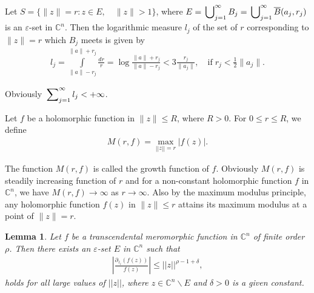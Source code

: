 \documentclass[11pt, reqno]{amsart}
\newtheorem*{cor A}{Corollary A}
\newtheorem*{cor B}{Corollary B}
\newtheorem{lem}{Lemma}[section]
\newcommand{\ol}{\overline}
\newcommand{\beas}{\begin{eqnarray*}}
\newcommand{\eeas}{\end{eqnarray*}}
\numberwithin{equation}{section}
\begin{document}
Let $S=\{\|z\|=r: z\in E,\quad \|z\|>1\}$, where $E=\sideset{}{_{j=1}^{\infty}}{\bigcup}B_j=\sideset{}{_{j=1}^{\infty}}{\bigcup} \ol B(a_j,r_j)$ is an $\varepsilon$-set in $\mathbb{C}^n$. Then the logarithmic measure $l_j$ of the set of $r$ corresponding to $\|z\|=r$  which $B_j$ meets is given by
\begin{align*} l_j=\int\limits_{\|a\|-r_j}^{\|a\|+r_j}\frac{d r}{r}=\log \frac{\|a\|+r_j}{\|a\|-r_j}<3\frac{r_j}{\|a_j\|}, \quad \text{if}\;r_j<\frac{1}{2}\|a_j\|.
\end{align*}

Obviously $\sideset{}{_{j=1}^{\infty}}{\sum} l_j<+\infty$.


\medskip
Let $f$ be a holomorphic function in $\|z\|\leq R$, where $R>0$. For $0\leq r\leq R$, we define 
\begin{align*}
M(r,f)=\max\limits_{||z||=r}|f(z)|.
\end{align*}

The function $M(r,f)$ is called the growth function of $f$. Obviously $M(r,f)$ is steadily increasing function of $r$ and for a non-constant holomorphic function $f$ in $\mathbb{C}^n$, we have $M(r,f)\to \infty$ as $r\to \infty$. Also by the maximum modulus principle, any holomorphic function $f(z)$ in $\|z\|\leq r$ attains its maximum modulus at a point of $\|z\|=r$.

\begin{lem}\label{ln2.10}\cite{Majumder-Sarkar-2026} Let $f$ be a transcendental meromorphic function in $\mathbb{C}^n$ of finite order $\rho$. 
Then there exists an $\varepsilon$-set $E$ in $\mathbb{C}^n$ such that
\beas \displaystyle \left|\frac{\partial_{z_i}(f(z))}{f(z)}\right|\leq ||z||^{\rho-1+\delta},\eeas
holds for all large values of $||z||$, where $z\in \mathbb{C}^n\backslash E$ and $\delta>0$ is a given constant. 
\end{lem}
\end{document}
